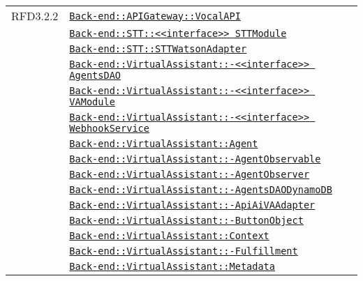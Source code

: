 \begin{longtable}{|>{\centering}m{3cm}|m{10cm}<{\centering}|}
RFD3.2.2 & \hyperref[Back-end::APIGateway::VocalAPI]{\texttt{Back-end::APIGateway::VocalAPI}}\\
& \hyperref[Back-end::STT::<<interface>> STTModule]{\texttt{Back-end::STT::<<interface>> STTModule}}\\
& \hyperref[Back-end::STT::STTWatsonAdapter]{\texttt{Back-end::STT::STTWatsonAdapter}}\\
& \hyperref[Back-end::VirtualAssistant::<<interface>> AgentsDAO]{\texttt{Back-end::VirtualAssistant::-\linebreak <<interface>> AgentsDAO}}\\
& \hyperref[Back-end::VirtualAssistant::<<interface>> VAModule]{\texttt{Back-end::VirtualAssistant::-\linebreak <<interface>> VAModule}}\\
& \hyperref[Back-end::VirtualAssistant::<<interface>> WebhookService]{\texttt{Back-end::VirtualAssistant::-\linebreak <<interface>> WebhookService}}\\
& \hyperref[Back-end::VirtualAssistant::Agent]{\texttt{Back-end::VirtualAssistant::Agent}}\\
& \hyperref[Back-end::VirtualAssistant::AgentObservable]{\texttt{Back-end::VirtualAssistant::-\linebreak AgentObservable}}\\
& \hyperref[Back-end::VirtualAssistant::AgentObserver]{\texttt{Back-end::VirtualAssistant::-\linebreak AgentObserver}}\\
& \hyperref[Back-end::VirtualAssistant::AgentsDAODynamoDB]{\texttt{Back-end::VirtualAssistant::-\linebreak AgentsDAODynamoDB}}\\
& \hyperref[Back-end::VirtualAssistant::ApiAiVAAdapter]{\texttt{Back-end::VirtualAssistant::-\linebreak ApiAiVAAdapter}}\\
& \hyperref[Back-end::VirtualAssistant::ButtonObject]{\texttt{Back-end::VirtualAssistant::-\linebreak ButtonObject}}\\
& \hyperref[Back-end::VirtualAssistant::Context]{\texttt{Back-end::VirtualAssistant::Context}}\\
& \hyperref[Back-end::VirtualAssistant::Fulfillment]{\texttt{Back-end::VirtualAssistant::-\linebreak Fulfillment}}\\
& \hyperref[Back-end::VirtualAssistant::Metadata]{\texttt{Back-end::VirtualAssistant::Metadata}}\\

\end{longtable}
